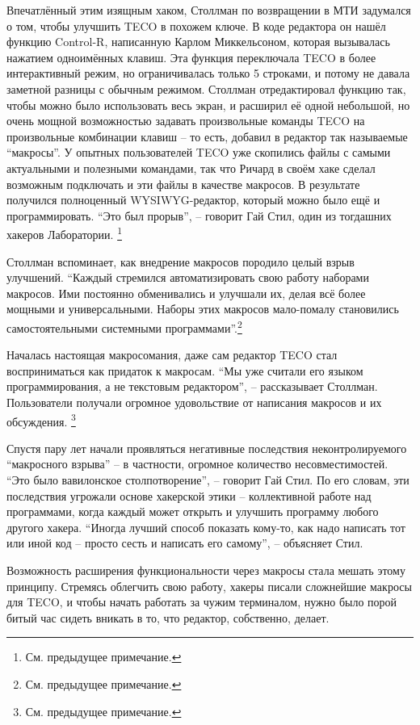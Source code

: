 Впечатлённый этим изящным хаком, Столлман по возвращении в МТИ задумался о том, чтобы улучшить TECO в похожем ключе. В коде редактора он нашёл функцию Control-R, написанную Карлом Миккельсоном, которая вызывалась нажатием одноимённых клавиш. Эта функция переключала TECO в более интерактивный режим, но ограничивалась только 5 строками, и потому не давала заметной разницы с обычным режимом. Столлман отредактировал функцию так, чтобы можно было использовать весь экран, и расширил её одной небольшой, но очень мощной возможностью задавать произвольные команды TECO на произвольные комбинации клавиш -- то есть, добавил в редактор так называемые \enquote{макросы}. У опытных пользователей TECO уже скопились файлы с самыми актуальными и полезными командами, так что Ричард в своём хаке сделал возможным подключать и эти файлы в качестве макросов. В результате получился полноценный WYSIWYG-редактор, который можно было ещё и программировать. \enquote{Это был прорыв}, -- говорит Гай Стил, один из тогдашних хакеров Лаборатории. \footnote{См. предыдущее примечание.}

Столлман вспоминает, как внедрение макросов породило целый взрыв улучшений. \enquote{Каждый стремился автоматизировать свою работу наборами макросов. Ими постоянно обменивались и улучшали их, делая всё более мощными и универсальными. Наборы этих макросов мало-помалу становились самостоятельными системными программами}.\footnote{См. предыдущее примечание.}

Началась настоящая макросомания, даже сам редактор TECO стал восприниматься как придаток к макросам. \enquote{Мы уже считали его языком программирования, а не текстовым редактором}, -- рассказывает Столлман. Пользователи получали огромное удовольствие от написания макросов и их обсуждения. \footnote{См. предыдущее примечание.}

Спустя пару лет начали проявляться негативные последствия неконтролируемого \enquote{макросного взрыва} -- в частности, огромное количество несовместимостей. \enquote{Это было вавилонское столпотворение}, -- говорит Гай Стил. По его словам, эти последствия угрожали основе хакерской этики -- коллективной работе над программами, когда каждый может открыть и улучшить программу любого другого хакера. \enquote{Иногда лучший способ показать кому-то, как надо написать тот или иной код -- просто сесть и написать его самому}, -- объясняет Стил.

Возможность расширения функциональности через макросы стала мешать этому принципу. Стремясь облегчить свою работу, хакеры писали сложнейшие макросы для TECO, и чтобы начать работать за чужим терминалом, нужно было порой битый час сидеть вникать в то, что редактор, собственно, делает.

